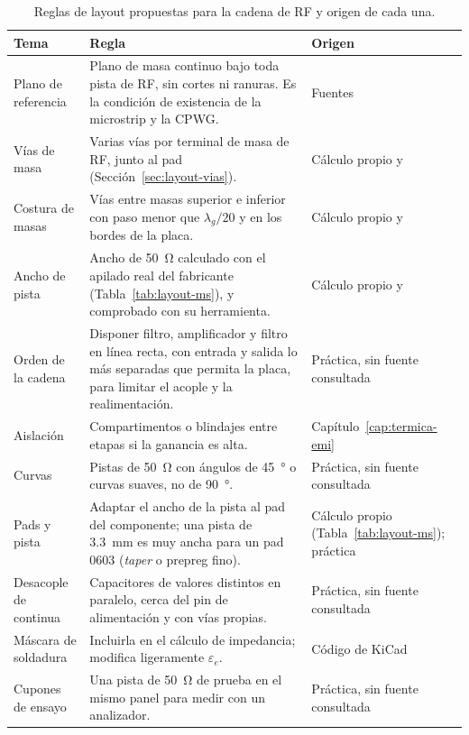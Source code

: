 \begin{table}[H]
  \centering
  \caption[Reglas de layout propuestas para la cadena de RF.]{Reglas de layout propuestas para la cadena de RF y origen de cada una.}\label{tab:layout-reglas}
  \begin{tabular}{@{}>{\raggedright\arraybackslash}p{3.1cm}>{\raggedright\arraybackslash}p{7.2cm}>{\raggedright\arraybackslash}p{4.3cm}@{}}
    \toprule
    Tema & Regla & Origen \\
    \midrule
    Plano de referencia & Plano de masa continuo bajo toda pista de RF, sin cortes ni ranuras. Es la condición de existencia de la microstrip y la CPWG\@. & Fuentes~\cite{pozar,steer1,rfessentialscpwg} \\
    Vías de masa & Varias vías por terminal de masa de RF, junto al pad (Sección~\ref{sec:layout-vias}). & Cálculo propio y~\cite{johnsonvia} \\
    Costura de masas & Vías entre masas superior e inferior con paso menor que $\lambda_g/20$ y en los bordes de la placa. & Cálculo propio y~\cite{rfessentialscpwg} \\
    Ancho de pista & Ancho de \SI{50}{\ohm} calculado con el apilado real del fabricante (Tabla~\ref{tab:layout-ms}), y comprobado con su herramienta. & Cálculo propio y~\cite{steer1,kicadcoplanar} \\
    Orden de la cadena & Disponer filtro, amplificador y filtro en línea recta, con entrada y salida lo más separadas que permita la placa, para limitar el acople y la realimentación. & Práctica, sin fuente consultada \\
    Aislación & Compartimentos o blindajes entre etapas si la ganancia es alta. & Capítulo~\ref{cap:termica-emi} \\
    Curvas & Pistas de \SI{50}{\ohm} con ángulos de \SI{45}{\degree} o curvas suaves, no de \SI{90}{\degree}. & Práctica, sin fuente consultada \\
    Pads y pista & Adaptar el ancho de la pista al pad del componente; una pista de \SI{3,3}{\milli\metre} es muy ancha para un pad 0603 (\textit{taper} o prepreg fino). & Cálculo propio (Tabla~\ref{tab:layout-ms}); práctica \\
    Desacople de continua & Capacitores de valores distintos en paralelo, cerca del pin de alimentación y con vías propias. & Práctica, sin fuente consultada \\
    Máscara de soldadura & Incluirla en el cálculo de impedancia; modifica ligeramente $\varepsilon_e$. & Código de KiCad~\cite{kicadcoplanar} \\
    Cupones de ensayo & Una pista de \SI{50}{\ohm} de prueba en el mismo panel para medir con un analizador. & Práctica, sin fuente consultada \\
    \bottomrule
  \end{tabular}
\end{table}

